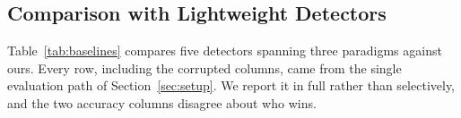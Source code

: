 \subsection{Comparison with Lightweight Detectors}
\label{sec:baselines}

Table~\ref{tab:baselines} compares five detectors spanning three paradigms against
ours. Every row, including the corrupted columns, came from the single evaluation
path of Section~\ref{sec:setup}. We report it in full rather than selectively, and
the two accuracy columns disagree about who wins.

